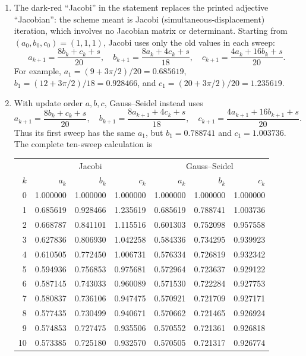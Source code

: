 \begin{enumerate}
\item[(a)] The dark-red ``Jacobi'' in the statement replaces the printed adjective ``Jacobian'': the scheme meant is Jacobi (simultaneous-displacement) iteration, which involves no Jacobian matrix or determinant. Starting from $(a_0,b_0,c_0)=(1,1,1)$, Jacobi uses only the old
values in each sweep:
\[
a_{k+1}=\frac{8b_k+c_k+s}{20},\quad
b_{k+1}=\frac{8a_k+4c_k+s}{18},\quad
c_{k+1}=\frac{4a_k+16b_k+s}{20}.
\]
For example, $a_1=(9+3\pi/2)/20=0.685619$,
$b_1=(12+3\pi/2)/18=0.928466$, and
$c_1=(20+3\pi/2)/20=1.235619$.
\item[(b)] With update order $a,b,c$, Gauss--Seidel instead uses
\[
a_{k+1}=\frac{8b_k+c_k+s}{20},\quad
b_{k+1}=\frac{8a_{k+1}+4c_k+s}{18},\quad
c_{k+1}=\frac{4a_{k+1}+16b_{k+1}+s}{20}.
\]
Thus its first sweep has the same $a_1$, but
$b_1=0.788741$ and $c_1=1.003736$.
The complete ten-sweep calculation is
\begin{center}\small
\begin{tabular}{r|rrr|rrr}\toprule
&\multicolumn{3}{c|}{Jacobi}&\multicolumn{3}{c}{Gauss--Seidel}\\
$k$&$a_k$&$b_k$&$c_k$&$a_k$&$b_k$&$c_k$\\\midrule
0 & 1.000000 & 1.000000 & 1.000000 & 1.000000 & 1.000000 & 1.000000 \\
1 & 0.685619 & 0.928466 & 1.235619 & 0.685619 & 0.788741 & 1.003736 \\
2 & 0.668787 & 0.841101 & 1.115516 & 0.601303 & 0.752098 & 0.957558 \\
3 & 0.627836 & 0.806930 & 1.042258 & 0.584336 & 0.734295 & 0.939923 \\
4 & 0.610505 & 0.772450 & 1.006731 & 0.576334 & 0.726819 & 0.932342 \\
5 & 0.594936 & 0.756853 & 0.975681 & 0.572964 & 0.723637 & 0.929122 \\
6 & 0.587145 & 0.743033 & 0.960089 & 0.571530 & 0.722284 & 0.927753 \\
7 & 0.580837 & 0.736106 & 0.947475 & 0.570921 & 0.721709 & 0.927171 \\
8 & 0.577435 & 0.730499 & 0.940671 & 0.570662 & 0.721465 & 0.926924 \\
9 & 0.574853 & 0.727475 & 0.935506 & 0.570552 & 0.721361 & 0.926818 \\
10 & 0.573385 & 0.725180 & 0.932570 & 0.570505 & 0.721317 & 0.926774 \\
\bottomrule\end{tabular}
\end{center}

\end{enumerate}
